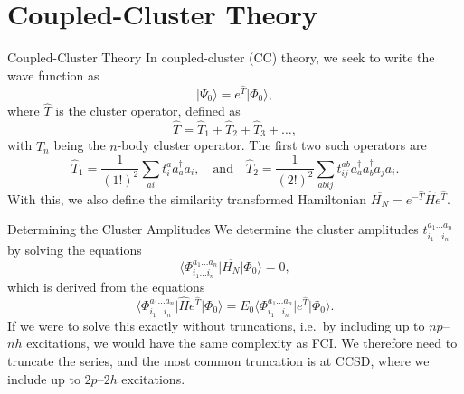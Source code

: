 \documentclass[UKenglish,aspectratio=169]{beamer}
\begin{document}
\section{Coupled-Cluster Theory}

\begin{frame}{Coupled-Cluster Theory}
    In coupled-cluster (CC) theory, we seek to write the wave function as
    \begin{equation}
        \lvert \Psi_0 \rangle = e^{\hat{T}} \lvert \Phi_0 \rangle,
    \end{equation}
    where $\hat{T}$ is the cluster operator, defined as
    \begin{equation}
        \hat{T} = \hat{T}_1 + \hat{T}_2 + \hat{T}_3 + \ldots,
    \end{equation}
    with $\hat{T}_n$ being the $n$-body cluster operator.
    The first two such operators are
    \begin{equation}
        \hat{T}_1 = \frac{1}{(1!)^2}\sum_{ai} t_i^a a_a^\dagger a_i,
        \quad \text{and} \quad
        \hat{T}_2 = \frac{1}{(2!)^2} \sum_{abij} t_{ij}^{ab} a_a^\dagger a_b^\dagger a_j a_i.
    \end{equation}
    With this, we also define the similarity transformed Hamiltonian $\overline{H_N} = e^{-\hat{T}} \hat{H} e^{\hat{T}}$.
\end{frame}

\begin{frame}{Determining the Cluster Amplitudes}
    We determine the cluster amplitudes $t_{i_1 \ldots i_n}^{a_1 \ldots a_n}$ by solving the equations
    \begin{equation}
        \Big\langle \Phi_{i_1 \ldots i_n}^{a_1 \ldots a_n} \vert \overline{H_N} \vert \Phi_0 \Big\rangle = 0,
    \end{equation}
    which is derived from the equations
    \begin{equation}
        \Big\langle \Phi_{i_1 \ldots i_n}^{a_1 \ldots a_n} \vert \hat{H}  e^{\hat{T}} \vert \Phi_0 \Big\rangle = E_0 \Big\langle \Phi_{i_1 \ldots i_n}^{a_1 \ldots a_n} \vert e^{\hat{T}} \vert \Phi_0 \Big\rangle.
    \end{equation}
    If we were to solve this exactly without truncations, i.e.\ by including up to $np$--$nh$ excitations, we would have the same complexity as FCI. %
    We therefore need to truncate the series, and the most common truncation is at CCSD, where we include up to $2p$--$2h$ excitations.
\end{frame}
\end{document}
